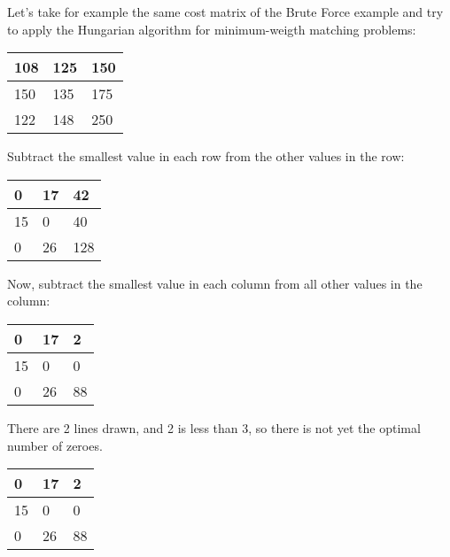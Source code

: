 Let's take for example the same cost matrix of the Brute Force example and try to apply the Hungarian algorithm for minimum-weigth matching problems:

\begin{table}[H]
\centering
\begin{tabular}{|m{0.5cm}|m{0.5cm}|m{0.5cm}|}
  \hline
  108 & 125 & 150 \\
  \hline
  150 & 135 & 175 \\
  \hline
  122 & 148 & 250 \\
  \hline
\end{tabular}
\end{table}

Subtract the smallest value in each row from the other values in the row:

\begin{table}[H]
\centering
\begin{tabular}{|m{0.5cm}|m{0.5cm}|m{0.5cm}|}
  \hline
  0 & 17 & 42 \\
  \hline
  15 & 0 & 40 \\
  \hline
  0 & 26 & 128 \\
  \hline
\end{tabular}
\end{table}

Now, subtract the smallest value in each column from all other values in the column:

\begin{table}[H]
\centering
\begin{tabular}{|m{0.5cm}|m{0.5cm}|m{0.5cm}|}
  \hline
  0 & 17 & 2 \\
  \hline
  15 & 0 & 0 \\
  \hline
  0 & 26 & 88 \\
  \hline
\end{tabular}
\end{table}

There are 2 lines drawn, and 2 is less than 3, so there is not yet the optimal number of zeroes.

\begin{table}[H]
\centering
\begin{tabular}{|m{0.5cm}|m{0.5cm}|m{0.5cm}|}
  \hline
  \cellcolor{gray!25} 0 & 17 & 2 \\
  \hline
  \cellcolor{gray!25} 15 & \cellcolor{gray!25} 0 & \cellcolor{gray!25} 0 \\
  \hline
  \cellcolor{gray!25} 0 & 26 & 88 \\
  \hline
\end{tabular}
\end{table}

